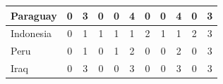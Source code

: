 \documentclass[12pt]{article}  %
\begin{document}
\begin{subappendices}
\begin{longtable}{|l|c|c|c|c|c|c|c|c|c|c|}
	\hline
	Paraguay                                                       & 0                                                                      & 3                                                                      & 0                                                                      & 0                                                                      & 4                                                                      & 0                                                                      & 0                         & 4                           & 0                           & 3                           \\ 
	\hline
	Indonesia                                                      & 0                                                                      & 1                                                                      & 1                                                                      & 1                                                                      & 1                                                                      & 2                                                                      & 1                         & 1                           & 2                           & 3                           \\ 
	\hline
	Peru                                                           & 0                                                                      & 1                                                                      & 0                                                                      & 1                                                                      & 2                                                                      & 0                                                                      & 0                         & 2                           & 0                           & 3                           \\ 
	\hline
	Iraq                                                           & 0                                                                      & 3                                                                      & 0                                                                      & 0                                                                      & 3                                                                      & 0                                                                      & 0                         & 3                           & 0                           & 3                           \\ 

\end{longtable}
\end{subappendices}
\end{document}
